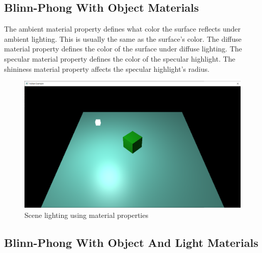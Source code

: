 \begin{minipage}{\linewidth}{\noindent}
    
\end{minipage}

\subsection{Blinn-Phong With Object Materials}

The ambient material property defines what color the surface reflects
under ambient lighting.
This is usually the same as the surface's color.
The diffuse material property defines the color of the surface under
diffuse lighting.
The specular material property defines the color of the specular highlight.
The shininess material property affects the specular highlight's radius.

\begin{minipage}{\linewidth}{\noindent}
    
\end{minipage}

\begin{figure}[H]
    \centering
    \includegraphics[scale=0.25]{images/ChBlinnPhong/SceneMaterials.png}
    \caption{Scene lighting using material properties}
    \label{fig::SceneMaterials}
\end{figure}

\subsection{Blinn-Phong With Object And Light Materials}

